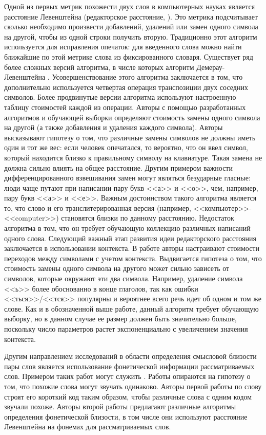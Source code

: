 Одной из первых метрик похожести двух слов в компьютерных науках является расстояние Левенштейна (редакторское расстояние, \cite{leven}). Это метрика подсчитывает сколько необходимо произвести добавлений, удалений или замен одного символа на другой, чтобы из одной строки получить вторую. Традиционно этот алгоритм используется для исправления опечаток: для введенного слова можно найти ближайшие по этой метрике слова из фиксированного словаря. Существует ряд более сложных версий алгоритма, в числе которых алгоритм Демерау-Левенштейна \cite{leven_dem}. Усовершенствование этого алгоритма заключается в том, что дополнительно используется четвертая операция транспозиции двух соседних символов. Более продвинутые версии алгоритма используют настроенную таблицу стоимостей каждой из операции. Авторы \cite{learn_leven} с помощью разработанных алгоритмов и обучающей выборки определяют стоимость замены одного символа на другой (а также добавления и удаления каждого символа). Авторы высказывают гипотезу о том, что различные замены символов не должны иметь один и тот же вес: если человек опечатался, то вероятно, что он ввел символ, который находится близко к правильному символу на клавиатуре. Такая замена не должна сильно влиять на общее расстояние. Другим примером важности дифференцированного взвешивания замен могут являться безударные гласные: люди чаще путают при написании пару букв <<а>> и <<о>>, чем, например, пару букв <<а>> и <<е>>. Важным достоинством такого алгоритма является то, что слово и его транслитерированная версия (например, <<компьютер>>-<<computer>>) становятся близки по данному расстоянию. Недостаток алгоритма в том, что он требует обучающую коллекцию различных написаний одного слова.
Следующий важный этап развития идеи редакторского расстояния заключается в использовании контекста. В работе \cite{context_leven} авторы настраивают стоимости переходов между символами с учетом контекста. Выдвигается гипотеза о том, что стоимость замены одного символа на другого может сильно зависеть от символов, которые окружают эти два символа. Например, удаление символа <<ь>> более обоснованно в конце глаголов, так как ошибки <<ться>>/<<тся>> популярны и вероятнее всего речь идет об одном и том же слове. Как и в обозначенной выше работе, данный алгоритм требует обучающую выборку, но в данном случае ее размер должен быть значительно больше, поскольку число параметров растет экспоненциально с увеличением значения контекста.

Другим направлением исследований в области определения смысловой близости пары слов является использование фонетической информации рассматриваемых слов. Примером таких работ могут служить \cite{soundex,phone_sim}. Работы опираются на гипотезу о том, что похожие слова могут звучать одинаково. Авторы первой работы по слову строят его короткий код таким образом, чтобы различные слова с одним кодом звучали похоже. Авторы второй работы предлагают различные алгоритмы определения фонетической близости, в том числе они используют расстояние Левенштейна на фонемах для рассматриваемых слов.

